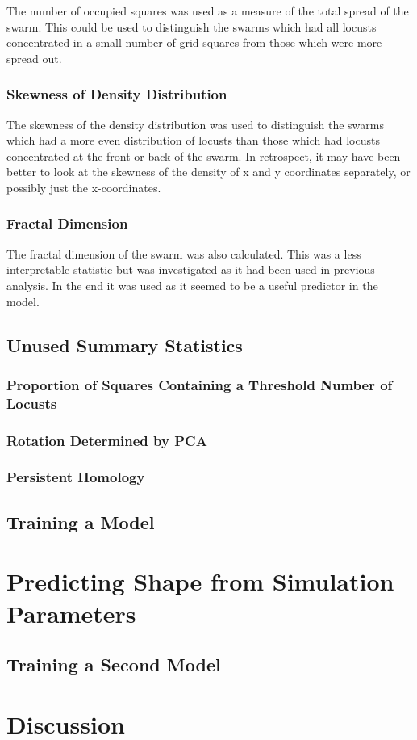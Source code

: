 \documentclass[a4paper]{article}
\begin{document}
The number of occupied squares was used as a measure of the total spread of the swarm. This could be used to distinguish the swarms which had all locusts concentrated in a small number of grid squares from those which were more spread out.

\subsubsection{Skewness of Density Distribution}

The skewness of the density distribution was used to distinguish the swarms which had a more even distribution of locusts than those which had locusts concentrated at the front or back of the swarm. In retrospect, it may have been better to look at the skewness of the density of x and y coordinates separately, or possibly just the x-coordinates.

\subsubsection{Fractal Dimension}

The fractal dimension of the swarm was also calculated. This was a less interpretable statistic but was investigated as it had been used in previous analysis. In the end it was used as it seemed to be a useful predictor in the model. 

\subsection*{Unused Summary Statistics}

\subsubsection{Proportion of Squares Containing a Threshold Number of Locusts}

\subsubsection{Rotation Determined by PCA}

\subsubsection{Persistent Homology}

\subsection{Training a Model}

\section{Predicting Shape from Simulation Parameters}

\subsection{Training a Second Model}

\section{Discussion}
\end{document}

